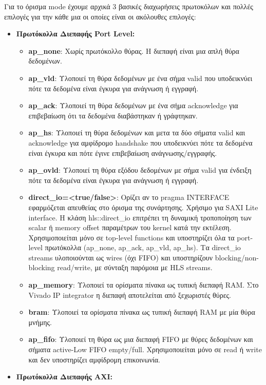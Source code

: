 Για το όρισμα mode έχουμε αρχικά 3 βασικές διαχωρήσεις πρωτοκόλων και πολλές επιλογές για την κάθε μια οι οποίες είναι οι ακόλουθες επιλογές:
\begin{itemize}
  \item \textbf{Πρωτόκολλα Διεπαφής Port Level:}
      \begin{itemize}
          \item \textbf{ap\_none}: Χωρίς πρωτόκολλο θύρας. Η διεπαφή είναι μια απλή θύρα δεδομένων.
          \item \textbf{ap\_vld}: Υλοποιεί τη θύρα δεδομένων με ένα σήμα valid που υποδεικνύει πότε τα δεδομένα είναι έγκυρα για ανάγνωση ή εγγραφή.
          \item \textbf{ap\_ack}: Υλοποιεί τη θύρα δεδομένων με ένα σήμα acknowledge για επιβεβαίωση ότι τα δεδομένα διαβάστηκαν ή γράφτηκαν.
          \item \textbf{ap\_hs}: Υλοποιεί τη θύρα δεδομένων και μετα τα δύο σήματα valid και acknowledge για αμφίδρομο handshake που υποδεικνύει πότε τα δεδομένα είναι έγκυρα και πότε έγινε επιβεβαίωση ανάγνωσης/εγγραφής.
          \item \textbf{ap\_ovld}: Υλοποιεί τη θύρα εξόδου δεδομένων με σήμα valid για ένδειξη πότε τα δεδομένα είναι έγκυρα για ανάγνωση ή εγγραφή.
          \item \textbf{direct\_io=<true/false>}: Ορίζει αν το pragma INTERFACE εφαρμόζεται απευθείας στο όρισμα της συνάρτησης. Χρήσιμο για SAXI Lite interface.
          Η κλάση hls::direct\_io επιτρέπει τη δυναμική τροποποίηση των scalar ή memory offset παραμέτρων του kernel κατά την εκτέλεση. 
          Χρησιμοποιείται μόνο σε top-level functions και υποστηρίζει όλα τα port-level πρωτόκολλα (ap\_none, ap\_ack, ap\_vld, ap\_hs). 
          Τα direct\_io streams υλοποιούνται ως wires (όχι FIFO) και υποστηρίζουν blocking/non-blocking read/write, με σύνταξη παρόμοια με HLS streams.
          \item \textbf{ap\_memory}: Υλοποιεί τα ορίσματα πίνακα ως τυπική διεπαφή RAM. Στο Vivado IP integrator η διεπαφή αποτελείται από ξεχωριστές θύρες.
          \item \textbf{bram}: Υλοποιεί τα ορίσματα πίνακα ως τυπική διεπαφή RAM με μία θύρα μνήμης.
          \item \textbf{ap\_fifo}: Υλοποιεί τη θύρα ως μια διεπαφή FIFO με θύρες δεδομένων και σήματα active-Low FIFO empty/full. Χρησιμοποιείται μόνο σε read ή write και δεν υποστηρίζει αμφίδρομη επικοινωνία.
      \end{itemize}
  \item \textbf{Πρωτόκολλα Διεπαφής AXI:}

\end{itemize}
